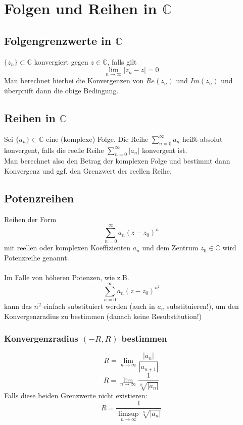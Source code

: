 \documentclass[a4paper,twocolumn,10pt]{article}
\begin{document}
\section{Folgen und Reihen in $\mathbb{C}$}

\subsection{Folgengrenzwerte in $\mathbb{C}$}
$\{z_n\}\subset \mathbb{C}$ konvergiert gegen $z\in\mathbb{C}$, falls gilt
\begin{equation*}
\lim\limits_{n\rightarrow \infty}|z_n-z|=0
\end{equation*}
Man berechnet hierbei die Konvergenzen von $Re(z_n)$ und $Im(z_n)$ und überprüft dann die obige Bedingung.

\subsection{Reihen in $\mathbb{C}$}
Sei $\{a_n\}\subset \mathbb{C}$ eine (komplexe) Folge. Die Reihe $\sum\limits_{n=0}^{\infty}a_n$ heißt absolut konvergent, falls die reelle Reihe $\sum\limits_{n=0}^{\infty}|a_n|$ konvergent ist.\\
Man berechnet also den Betrag der komplexen Folge und bestimmt dann Konvergenz und ggf. den Grenzwert der reellen Reihe.

\subsection{Potenzreihen}
Reihen der Form
\begin{equation*}
\sum\limits_{n=0}^{\infty}a_n(z-z_0)^n
\end{equation*}
mit reellen oder komplexen Koeffizienten $a_n$ und dem Zentrum $z_0\in\mathbb{C}$ wird Potenzreihe genannt.\\\\
Im Falle von höheren Potenzen, wie z.B.
\begin{equation*}
\sum\limits_{n=0}^{\infty}a_n(z-z_0)^{n^2}
\end{equation*}
kann das $n^2$ einfach substituiert werden (auch in $a_n$ substituieren!), um den Konvergenzradius zu bestimmen (danach keine Resubstitution!)
\subsubsection{Konvergenzradius $(-R,R)$ bestimmen}
\begin{equation*}
R=\lim\limits_{n\rightarrow\infty}\frac{|a_n|}{|a_{n+1}|}
\end{equation*}
\begin{equation*}
R=\lim\limits_{n\rightarrow\infty}\frac{1}{\sqrt[n]{|a_n|}}
\end{equation*}
Falls diese beiden Grenzwerte nicht existieren:
\begin{equation*}
R=\frac{1}{\limsup\limits_{n\rightarrow\infty}\sqrt[n]{|a_n|}}
\end{equation*}
\end{document}
